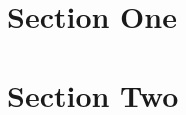 \documentclass[a4paper]{article}
\begin{document}
	


\tableofcontents
\clearpage
\listoffigures
\clearpage
\listoftables
\clearpage


\section{Section One}
\label{sec:section_one}

\clearpage

\section{Section Two}
\label{sec:section_two}

\clearpage

\printbibliography
\end{document}
